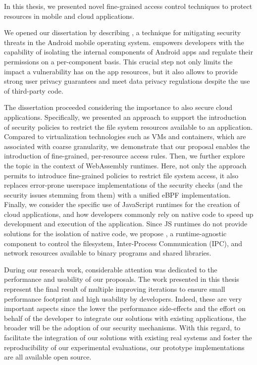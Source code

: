 In this thesis, we presented novel fine-grained access control
techniques to protect resources in mobile and cloud applications.

We opened our dissertation by describing \seapp, a technique for
mitigating security threats in the Android mobile operating system.
\seapp empowers developers with the capability of isolating the
internal components of Android apps and regulate their permissions on
a per-component basis. This crucial step not only limits the impact a
vulnerability has on the app resources, but it also allows to provide
strong user privacy guarantees and meet data privacy regulations
despite the use of third-party code.

The dissertation proceeded considering the importance to also secure
cloud applications. Specifically, we presented an approach to support
the introduction of security policies to restrict the file system
resources available to an application. Compared to virtualization
technologies such as VMs and containers, which are associated with
coarse granularity, we demonstrate that our proposal enables the
introduction of fine-grained, per-resource access rules. Then, we
further explore the topic in the context of WebAssembly runtimes.
Here, not only the approach permits to introduce fine-grained
policies to restrict file system access, it also replaces error-prone
userspace implementations of the security checks (and the security
issues stemming from them) with a unified eBPF implementation.
Finally, we consider the specific use of JavaScript runtimes for the
creation of cloud applications, and how developers commonly rely on
native code to speed up development and execution of the application.
Since JS runtimes do not provide solutions for the isolation of native
code, we propose \natisand, a runtime-agnostic component to control
the filesystem, Inter-Process Communication (IPC), and network
resources available to binary programs and shared libraries.

During our research work, considerable attention was dedicated to the
performance and usability of our proposals. The work presented in this
thesis represent the final result of multiple improving iterations to
ensure small performance footprint and high usability by developers.
Indeed, these are very important aspects since the lower the
performance side-effects and the effort on behalf of the developer to
integrate our solutions with existing applications, the broader will
be the adoption of our security mechanisms. With this regard, to
facilitate the integration of our solutions with existing real systems
and foster the reproducibility of our experimental evaluations, our
prototype implementations are all available open source.


